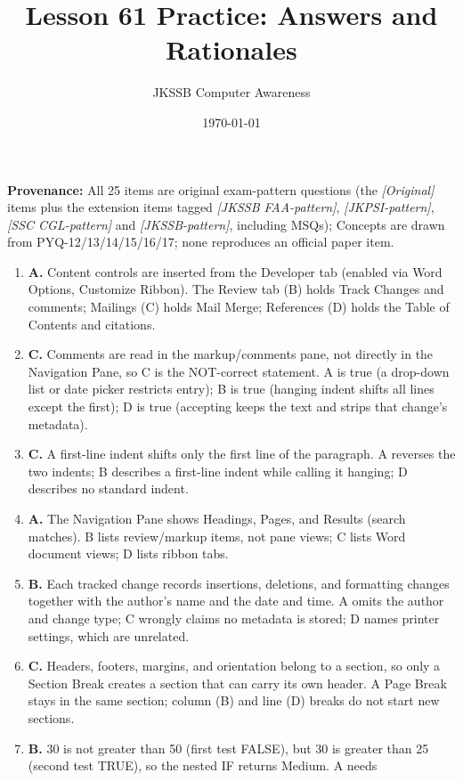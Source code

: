 \documentclass[11pt]{article}
\title{Lesson 61 Practice: Answers and Rationales}
\author{JKSSB Computer Awareness}
\date{\today}
\begin{document}
\maketitle
\noindent\textbf{Provenance:} All 25 items are original exam-pattern questions (the \textit{[Original]} items plus the extension items tagged \textit{[JKSSB FAA-pattern]}, \textit{[JKPSI-pattern]}, \textit{[SSC CGL-pattern]} and \textit{[JKSSB-pattern]}, including MSQs); Concepts are drawn from PYQ-12/13/14/15/16/17; none reproduces an official paper item.

\begin{enumerate}[label=\textbf{Q\arabic*.}, leftmargin=*]
\item \textbf{A.} Content controls are inserted from the Developer tab (enabled
  via Word Options, Customize Ribbon). The Review tab (B) holds Track Changes
  and comments; Mailings (C) holds Mail Merge; References (D) holds the Table
  of Contents and citations.
\item \textbf{C.} Comments are read in the markup/comments pane, not directly
  in the Navigation Pane, so C is the NOT-correct statement. A is true (a
  drop-down list or date picker restricts entry); B is true (hanging indent
  shifts all lines except the first); D is true (accepting keeps the text and
  strips that change's metadata).
\item \textbf{C.} A first-line indent shifts only the first line of the
  paragraph. A reverses the two indents; B describes a first-line indent while
  calling it hanging; D describes no standard indent.
\item \textbf{A.} The Navigation Pane shows Headings, Pages, and Results
  (search matches). B lists review/markup items, not pane views; C lists Word
  document views; D lists ribbon tabs.
\item \textbf{B.} Each tracked change records insertions, deletions, and
  formatting changes together with the author's name and the date and time. A
  omits the author and change type; C wrongly claims no metadata is stored; D
  names printer settings, which are unrelated.
\item \textbf{C.} Headers, footers, margins, and orientation belong to a
  section, so only a Section Break creates a section that can carry its own
  header. A Page Break stays in the same section; column (B) and line (D)
  breaks do not start new sections.
\item \textbf{B.} 30 is not greater than 50 (first test FALSE), but 30 is
  greater than 25 (second test TRUE), so the nested IF returns Medium. A needs

\end{enumerate}
\end{document}
